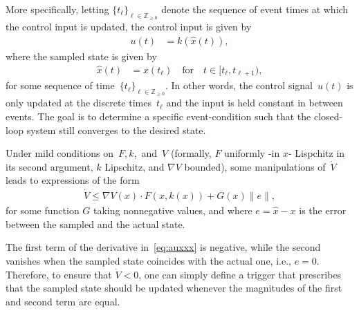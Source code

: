\documentclass{autart}
\newcommand{\integernonnegative}{\mathbb{Z}_{\ge 0}}
\renewcommand{\hat}{\widehat}
\begin{document}
{More specifically, letting $\{ t_\ell \}_{\ell \in
    \integernonnegative}$ denote the sequence of event times at which
  the control input is updated, the control input is given by
\begin{align}\label{eq:control}
  u(t) &= k(\hat{x}(t)),
\end{align}
where the sampled state is given by
\begin{align}\label{eq:estimate}
\hat{x}(t) &= x(t_\ell) \quad \text{for} \quad t \in [t_\ell,t_{\ell+1}),
\end{align}
for some sequence of time~$\{t_\ell\}_{\ell \in \integernonnegative}$. 
In other words, the control signal~$u(t)$ is only updated at the
discrete times~$t_\ell$ and the input is held constant in between
events. The goal is to determine a specific event-condition such that
the closed-loop system still converges to the desired state.

Under mild conditions on~$F, k,$ and~$V$ (formally, $F$ uniformly -in
$x$- Lispchitz in its second argument, $k$ Lipschitz, and $\nabla V$
bounded), some manipulations of~$\dot{V}$ leads to expressions of the
form
\begin{align}\label{eq:auxxx}
  \dot V \le \nabla V(x) \cdot F(x,k(x)) + G(x) \|e\| ,
\end{align}
for some function $G$ taking nonnegative values, and where $e =
\hat{x} - x$ is the error between the sampled and the actual state.}
The first term of the derivative in~\eqref{eq:auxxx} is negative,
while the second vanishes when the sampled state coincides with the
actual one, i.e., $e=0$. Therefore, to ensure that $\dot V<0$, one can
simply define a trigger that prescribes that the sampled state should
be updated whenever the magnitudes of the first and second term are
equal.
\end{document}
